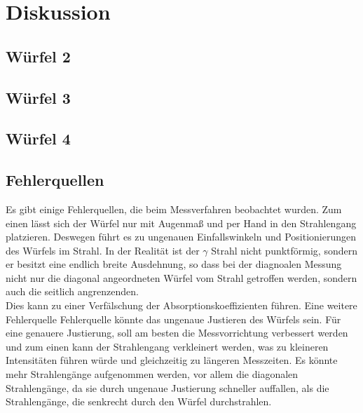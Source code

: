 \section{Diskussion}
\label{sec:Diskussion}


\subsection{Würfel 2}

\subsection{Würfel 3}

\subsection{Würfel 4}

\subsection{Fehlerquellen}

Es gibt einige Fehlerquellen, die beim Messverfahren beobachtet wurden. Zum einen lässt sich der Würfel nur mit Augenmaß und per Hand in den Strahlengang platzieren. 
Deswegen führt es zu ungenauen Einfallswinkeln und Positionierungen des Würfels im Strahl. In der Realität ist der $\gamma$ Strahl nicht punktförmig, sondern er besitzt eine endlich breite Ausdehnung, 
so dass bei der diagnoalen Messung nicht nur die diagonal angeordneten Würfel vom Strahl getroffen werden, sondern auch die seitlich angrenzenden. \\
Dies kann zu einer Verfälschung der Absorptionskoeffizienten führen. Eine weitere Fehlerquelle Fehlerquelle könnte das ungenaue Justieren des Würfels sein. 
Für eine genauere Justierung, soll am besten die Messvorrichtung verbessert werden und zum einen kann der Strahlengang verkleinert werden, was zu kleineren Intensitäten führen würde und gleichzeitig zu längeren Messzeiten. Es könnte mehr Strahlengänge aufgenommen werden, vor allem die diagonalen Strahlengänge, da sie durch ungenaue Justierung schneller auffallen, als die Strahlengänge, die senkrecht durch den Würfel durchstrahlen. 
